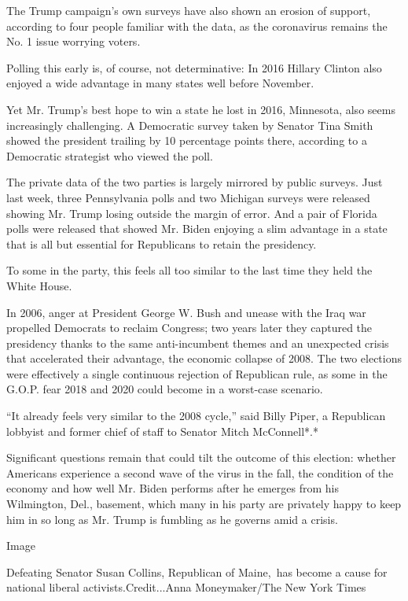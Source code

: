 The Trump campaign's own surveys have also shown an erosion of support,
according to four people familiar with the data, as the coronavirus
remains the No. 1 issue worrying voters.

Polling this early is, of course, not determinative: In 2016 Hillary
Clinton also enjoyed a wide advantage in many states well before
November.

Yet Mr. Trump's best hope to win a state he lost in 2016, Minnesota,
also seems increasingly challenging. A Democratic survey taken by
Senator Tina Smith showed the president trailing by 10 percentage points
there, according to a Democratic strategist who viewed the poll.

The private data of the two parties is largely mirrored by public
surveys. Just last week, three Pennsylvania polls and two Michigan
surveys were released showing Mr. Trump losing outside the margin of
error. And a pair of Florida polls were released that showed Mr. Biden
enjoying a slim advantage in a state that is all but essential for
Republicans to retain the presidency.

To some in the party, this feels all too similar to the last time they
held the White House.

In 2006, anger at President George W. Bush and unease with the Iraq war
propelled Democrats to reclaim Congress; two years later they captured
the presidency thanks to the same anti-incumbent themes and an
unexpected crisis that accelerated their advantage, the economic
collapse of 2008. The two elections were effectively a single continuous
rejection of Republican rule, as some in the G.O.P. fear 2018 and 2020
could become in a worst-case scenario.

``It already feels very similar to the 2008 cycle,'' said Billy Piper, a
Republican lobbyist and former chief of staff to Senator Mitch
McConnell*.*

Significant questions remain that could tilt the outcome of this
election: whether Americans experience a second wave of the virus in the
fall, the condition of the economy and how well Mr. Biden performs after
he emerges from his Wilmington, Del., basement, which many in his party
are privately happy to keep him in so long as Mr. Trump is fumbling as
he governs amid a crisis.

Image

Defeating Senator Susan Collins, Republican of Maine,~has become a cause
for national liberal activists.Credit...Anna Moneymaker/The New York
Times

